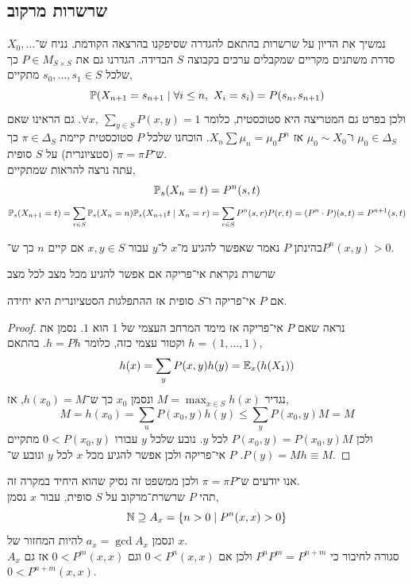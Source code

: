 \subsection{שרשרות מרקוב}
נמשיך את הדיון על שרשרות בהתאם להגדרה שסיפקנו בהרצאה הקודמת.
נניח ש־$X_0, \ldots$ סדרת משתנים מקריים שמקבלים ערכים בקבוצה $S$ הבדידה.
הגדרנו גם את $P \in M_{S \times S}$ כך שלכל $s_0, \ldots, s_1 \in S$ מתקיים,
\[
	\mathbb{P}(X_{n + 1} = s_{n + 1} \mid \forall i \le n,\ X_i = s_i)
	= P(s_n, s_{n + 1})
\]
ולכן בפרט גם המטריצה היא סטוכסטית, כלומר $\forall x,\ \sum_{y \in S} P(x, y) = 1$.
גם הראינו שאם $\mu_0 \in \Delta_S$ ו־$\mu_0 \sim X_0$ אז $X_n \sum \mu_n = \mu_0 P^n$.
הוכחנו שלכל $P$ סטוכסטית קיימת $\pi \in \Delta_S$ כך ש־$\pi = \pi P$ (סטציונרית) על $S$ סופית. \\
עתה נרצה להראות שמתקיים,
\[
	\mathbb{P}_s(X_n = t)
	= P^n(s, t)
\]
\[
	\mathbb{P}_s(X_{n + 1} = t)
	= \sum_{r \in S} \mathbb{P}_s(X_n = n) \mathbb{P}_s(X_{n + 1} t \mid X_n = r)
	= \sum_{r \in S} P^n(s, r) P(r, t)
	= (P^n \cdot P)(s, t)
	= P^{n + 1}(s, t)
\]
\begin{definition}
	בהינתן $P$ נאמר שאפשר להגיע מ־$x$ ל־$y$ עבור $x, y \in S$ אם קיים $n$ כך ש־$P^n(x, y) > 0$.
\end{definition}
\begin{definition}
	שרשרת נקראת אי־פריקה אם אפשר להגיע מכל מצב לכל מצב
\end{definition}
\begin{theorem}
	אם $P$ אי־פריקה ו־$S$ סופית אז ההתפלגות הסטציונרית היא יחידה.
\end{theorem}
\begin{proof}
	נראה שאם $P$ אי־פריקה אז מימד המרחב העצמי של $1$ הוא $1$.
	נסמן את $h = (1, \ldots, 1)$ וקטור עצמי כזה, כלומר $h = P h$.
	בהתאם,
	\[
		h(x)
		= \sum_y P(x, y) h(y)
		= \mathbb{E}_x(h(X_1))
	\]
	נגדיר $M = \max_{x \in S} h(x)$ ונסמן $x_0$ כך ש־$h(x_0) = M$, אז,
	\[
		M
		= h(x_0)
		= \sum_u P(x_0, y) h(y)
		\le \sum_y P(x_0, y) M
		= M
	\]
	ולכן $P(x_0, y) = P(x_0, y) M$ לכל $y$.
	נובע שלכל $y$ עבורו $0 < P(x_0, y)$ מתקיים $P(y) = M$.
	$P$ אי־פריקה ולכן אפשר להגיע מכל $x$ לכל $y$ ונובע ש־$h \equiv M$.
\end{proof}
אנו יודעים ש־$\pi = \pi P$ ולכן ממשפט זה נסיק שהוא היחיד במקרה זה. \\
תהי $P$ שרשרת־מרקוב על $S$ סופית, עבור $x$ נסמן,
\[
	\mathbb{N}
	\supseteq A_x
	= \{ n > 0 \mid P^n(x, x) > 0 \}
\]
ונסמן $a_x = \gcd A_x$ להיות המחזור של $x$. \\
$A_x$ סגורה לחיבור כי $P^n P^m = P^{n + m}$ ולכן אם $0 < P^n(x, x)$ וגם $0 < P^m(x, x)$ אז גם $0 < P^{n + m}(x, x)$.
